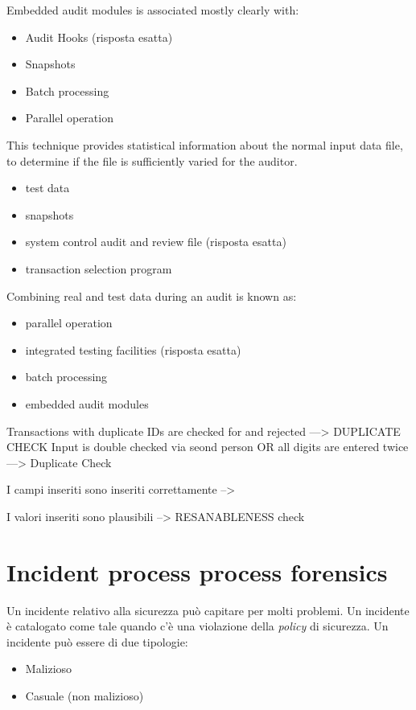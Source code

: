 
Embedded audit modules is associated mostly clearly with:
\begin{itemize}
\item Audit Hooks (risposta esatta)
\item Snapshots
\item Batch processing
\item Parallel operation
\end{itemize}

This technique provides statistical information about the normal input data
file, to determine if the file is sufficiently varied for the auditor.

\begin{itemize}
\item test data
\item snapshots
\item system control audit and review file (risposta esatta)
\item transaction selection program
\end{itemize}


Combining real and test data during an audit is known as:
\begin{itemize}
\item parallel operation
\item integrated testing facilities (risposta esatta)
\item batch processing
\item embedded audit modules
\end{itemize}



Transactions with duplicate IDs are checked for and rejected ---> DUPLICATE
CHECK
Input is double checked via seond person OR all digits are entered twice --->
Duplicate Check

I campi inseriti sono inseriti correttamente -->


I valori inseriti sono plausibili --> RESANABLENESS check


\part{Incident process process forensics}

Un incidente relativo alla sicurezza può capitare per molti problemi. Un
incidente è catalogato come tale quando c'è una violazione della \textit{policy}
di sicurezza. Un incidente può essere di due tipologie:
\begin{itemize}
\item Malizioso
\item Casuale (non malizioso)
\end{itemize}

